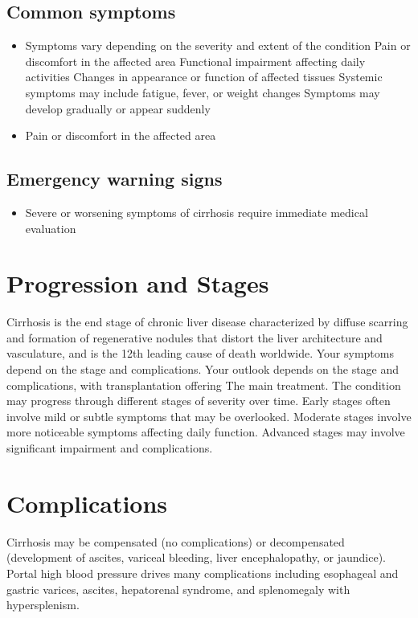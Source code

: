 \subsection{Common symptoms}
\begin{itemize}[noitemsep]
  \item Symptoms vary depending on the severity and extent of the condition Pain or discomfort in the affected area Functional impairment affecting daily activities Changes in appearance or function of affected tissues Systemic symptoms may include fatigue, fever, or weight changes Symptoms may develop gradually or appear suddenly
  \item Pain or discomfort in the affected area
  \end{itemize}

\subsection{Emergency warning signs}
\begin{itemize}[noitemsep]
  \item Severe or worsening symptoms of cirrhosis require immediate medical evaluation
\end{itemize}
\section{Progression and Stages}
Cirrhosis is the end stage of chronic liver disease characterized by diffuse scarring and formation of regenerative nodules that distort the liver architecture and vasculature, and is the 12th leading cause of death worldwide. Your symptoms depend on the stage and complications. Your outlook depends on the stage and complications, with transplantation offering The main treatment. The condition may progress through different stages of severity over time. Early stages often involve mild or subtle symptoms that may be overlooked. Moderate stages involve more noticeable symptoms affecting daily function. Advanced stages may involve significant impairment and complications.
\section{Complications}
Cirrhosis may be compensated (no complications) or decompensated (development of ascites, variceal bleeding, liver encephalopathy, or jaundice). Portal high blood pressure drives many complications including esophageal and gastric varices, ascites, hepatorenal syndrome, and splenomegaly with hypersplenism.

